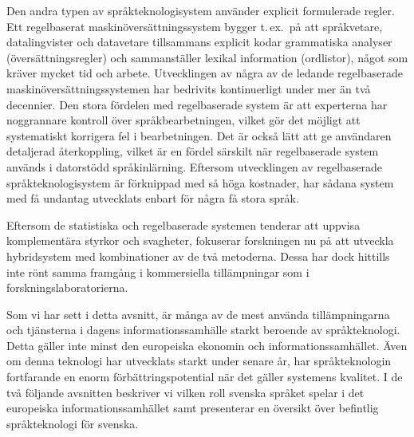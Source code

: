 \begin{multicols}{2}
Den andra typen av språkteknologisystem använder explicit formulerade
regler. Ett regelbaserat maskin\-över\-sätt\-nings\-system bygger
t.\,ex.~på att språkvetare, datalingvister och datavetare tillsammans
explicit kodar grammatiska analyser (översättningsregler) och
sammanställer lexikal information (ordlistor), något som kräver mycket
tid och arbete. Utvecklingen av några av de ledande regelbaserade
maskinöversättningssystemen har bedrivits kontinuerligt under mer än
två decennier. Den stora fördelen med regelbaserade system är att
experterna har noggrannare kontroll över språkbearbetningen, vilket
gör det möjligt att systematiskt korrigera fel i bearbetningen. Det är
också lätt att ge användaren detaljerad återkoppling, vilket är en
fördel särskilt när regelbaserade system används i datorstödd
språkinlärning. Eftersom utvecklingen av regelbaserade
språkteknologisystem är förknippad med så höga kostnader, har sådana
system med få undantag utvecklats enbart för några få stora språk.

Eftersom de statistiska och regelbaserade systemen tenderar att
uppvisa komplementära styrkor och svagheter, fokuserar forskningen nu
på att utveckla hybridsystem med kombinationer av de två
metoderna. Dessa har dock hittills inte rönt samma framgång i
kommersiella tillämpningar som i forskningslaboratorierna.


Som vi har sett i detta avsnitt, är många av de mest använda
tillämpningarna och tjänsterna i dagens informationssamhälle starkt
beroende av språkteknologi. Detta gäller inte minst den europeiska
ekonomin och informationssamhället. Även om denna teknologi har
utvecklats starkt under senare år, har språkteknologin fortfarande en
enorm förbättringspotential när det gäller systemens kvalitet. I de
två följande avsnitten beskriver vi vilken roll svenska språket spelar
i det europeiska informationssamhället samt presenterar en översikt
över befintlig språkteknologi för svenska.


\end{multicols}

\clearpage




